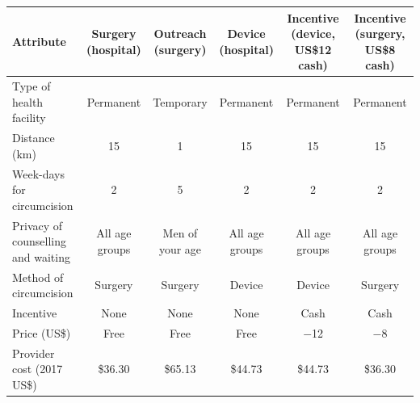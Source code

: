 \begin{tabular}{lccccc}
\toprule
Attribute & \makecell{Surgery\\(hospital)} & \makecell{Outreach\\(surgery)} & \makecell{Device\\(hospital)} & \makecell{Incentive\\(device,\\US\$12 cash)} & \makecell{Incentive\\(surgery,\\US\$8 cash)}
\\
\midrule
Type of health facility & Permanent & Temporary & Permanent & Permanent & Permanent \\
Distance (km) & 15 & 1 & 15 & 15 & 15 \\
Week-days for circumcision & 2 & 5 & 2 & 2 & 2 \\
Privacy of counselling and waiting & All age groups & Men of your age & All age groups & All age groups & All age groups \\
Method of circumcision & Surgery & Surgery & Device & Device & Surgery \\
Incentive & None & None & None & Cash & Cash \\
Price (US\$) & Free & Free & Free & $-$12 & $-$8 \\
Provider cost (2017 US\$) & \$36.30 & \$65.13 & \$44.73 & \$44.73 & \$36.30 \\
\bottomrule
\end{tabular}
